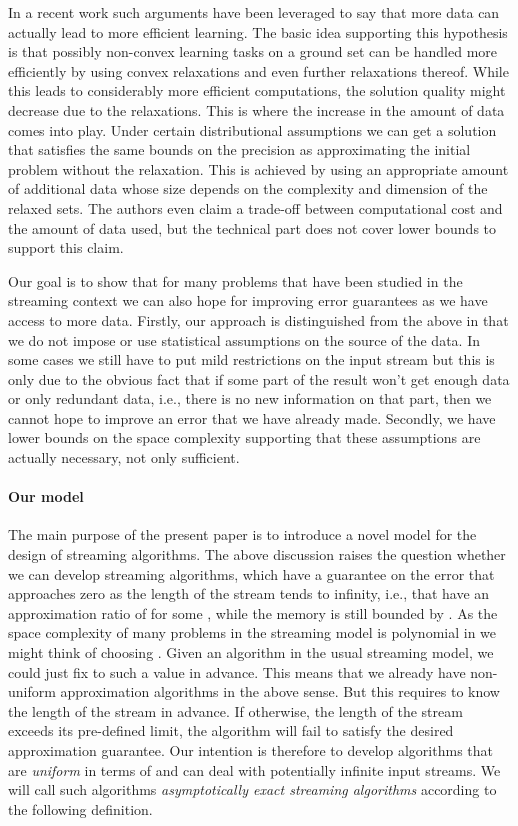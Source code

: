 \documentclass[a4paper,11pt,oneside,english,onecolumn]{article}
\theoremstyle{definition}
\begin{document}
In a recent work \cite{MichaelJordan2013} such arguments have been leveraged to say that more data can actually lead to more efficient learning. The basic idea supporting this hypothesis is that possibly non-convex learning tasks on a ground set  can be handled more efficiently by using convex relaxations  and even further relaxations  thereof. While this leads to considerably more efficient computations, the solution quality might decrease due to the relaxations. This is where the increase in the amount of data comes into play. Under certain distributional assumptions we can get a solution that satisfies the same bounds on the precision as approximating the initial problem without the relaxation. This is achieved by using an appropriate amount of additional data whose size depends on the complexity and dimension of the relaxed sets. The authors even claim a trade-off between computational cost and the amount of data used, but the technical part does not cover lower bounds to support this claim.

Our goal is to show that for many problems that have been studied in the streaming context we can also hope for improving error guarantees as we have access to more data. Firstly, our approach is distinguished from the above in that we do not impose or use statistical assumptions on the source of the data. In some cases we still have to put mild restrictions on the input stream but this is only due to the obvious fact that if some part of the result won't get enough data or only redundant data, i.e., there is no new information on that part, then we cannot hope to improve an error that we have already made. Secondly, we have lower bounds on the space complexity supporting that these assumptions are actually necessary, not only sufficient.

\paragraph*{Our model} The main purpose of the present paper is to introduce a novel model for the design of streaming algorithms. The above discussion raises the question whether we can develop streaming algorithms, which have a guarantee on the error that approaches zero as the length  of the stream tends to infinity, i.e., that have an approximation ratio of  for some , while the memory is still bounded by . As the space complexity of many problems in the streaming model is polynomial in  we might think of choosing . Given an algorithm in the usual streaming model, we could just fix  to such a value in advance. This means that we already have non-uniform approximation algorithms in the above sense. But this requires to know the length of the stream in advance. If otherwise, the length of the stream exceeds its pre-defined limit, the algorithm will fail to satisfy the desired approximation guarantee. Our intention is therefore to develop algorithms that are \emph{uniform} in terms of  and can deal with potentially infinite input streams. We will call such algorithms \emph{asymptotically exact streaming algorithms} according to the following definition.
\end{document}
